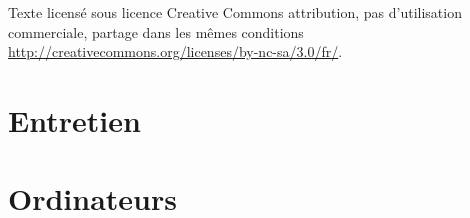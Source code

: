 \documentclass[11pt,francais]{book} %
\begin{document}
\noindent \cc \ccnc \bysa

\noindent Texte licensé sous licence Creative Commons attribution, pas d’utilisation commerciale, partage dans les mêmes conditions \url{http://creativecommons.org/licenses/by-nc-sa/3.0/fr/}.






\pagestyle{empty} %

\tableofcontents %

\cleardoublepage %

\pagestyle{fancy} %




\chapter{Entretien}





\chapter{Ordinateurs}
\end{document}
